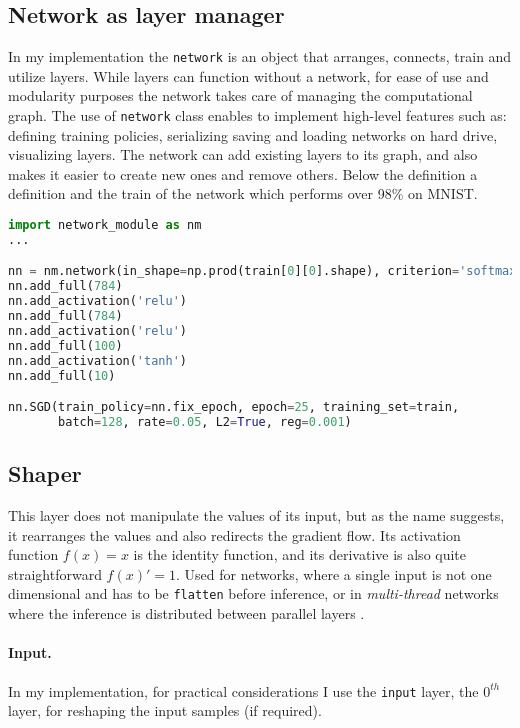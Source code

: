 \subsection{Network as layer manager}
In my implementation the \texttt{network} is an object that arranges, connects, train and utilize layers.
While layers can function without a network, for ease of use and modularity purposes
the network takes care of managing the computational graph.
The use of \texttt{network} class enables to implement high-level features such as:
defining training policies, serializing saving and loading networks on hard drive,
visualizing layers.
The network can add existing layers to its graph, and also makes it easier to create new ones and remove others.
Below the definition a definition and the train of the network which performs over 98\% on MNIST.
\clearpage
\begin{lstlisting}[language=Python]
import network_module as nm
...

nn = nm.network(in_shape=np.prod(train[0][0].shape), criterion='softmax')
nn.add_full(784)
nn.add_activation('relu')
nn.add_full(784)
nn.add_activation('relu')
nn.add_full(100)
nn.add_activation('tanh')
nn.add_full(10)

nn.SGD(train_policy=nn.fix_epoch, epoch=25, training_set=train,
       batch=128, rate=0.05, L2=True, reg=0.001)
\end{lstlisting}



\subsection{Shaper} This layer does not manipulate the values of its input, but as the name suggests, it rearranges the values and also redirects the gradient flow.
Its activation function $f(x) = x$ is the identity function, and its derivative is also quite straightforward $f(x)'=1$.
Used for networks, where a single input is not one dimensional and has to be \texttt{flatten} before inference, or in \emph{multi-thread} networks where the inference is distributed between parallel layers \cite{szegedy2015going}.
\paragraph{Input.} In my implementation, for practical considerations I use the \texttt{input} layer, the $0^{th}$ layer, for reshaping the input samples (if required).

